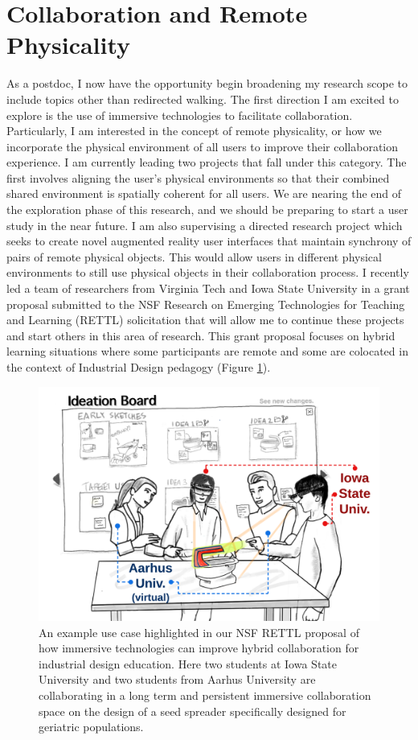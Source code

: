 \section*{Collaboration and Remote Physicality}
\vspace{-0.25cm}
As a postdoc, I now have the opportunity begin broadening my research scope to include topics other than redirected walking. The first direction I am excited to explore is the use of immersive technologies to facilitate collaboration. Particularly, I am interested in the concept of remote physicality, or how we incorporate the physical environment of all users to improve their collaboration experience. I am currently leading two projects that fall under this category. The first involves aligning the user's physical environments so that their combined shared environment is spatially coherent for all users. We are nearing the end of the exploration phase of this research, and we should be preparing to start a user study in the near future. I am also supervising a directed research project which seeks to create novel augmented reality user interfaces that maintain synchrony of pairs of remote physical objects. This would allow users in different physical environments to still use physical objects in their collaboration process. I recently led a team of researchers from Virginia Tech and Iowa State University in a grant proposal submitted to the NSF Research on Emerging Technologies for Teaching and Learning (RETTL) solicitation that will allow me to continue these projects and start others in this area of research. This grant proposal focuses on hybrid learning situations where some participants are remote and some are colocated in the context of Industrial Design pedagogy (Figure \ref{fig:rettl}).

\begin{figure}[!htb]
  \centering
  \includegraphics[width=.75\textwidth]{figures/rettl.png}
	\caption[]{An example use case highlighted in our NSF RETTL proposal of how immersive technologies can improve hybrid collaboration for industrial design education. Here two students at Iowa State University and two students from Aarhus University are collaborating in a long term and persistent immersive collaboration space on the design of a seed spreader specifically designed for geriatric populations.}
  \label{fig:rettl}
\end{figure}

